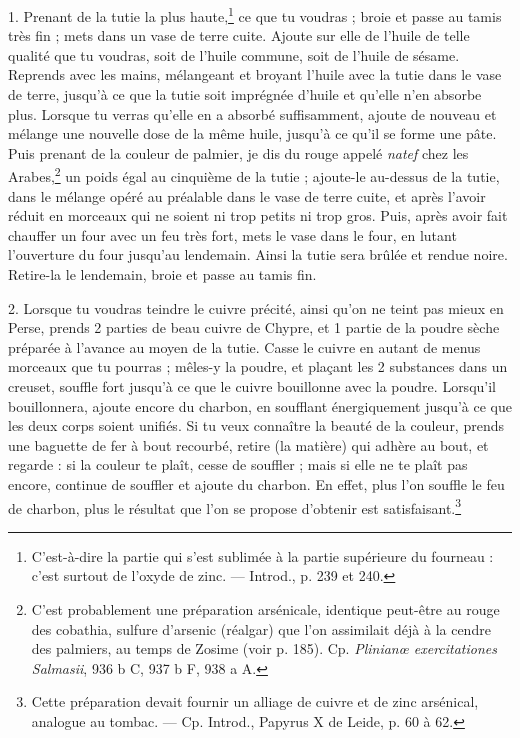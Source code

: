 \documentclass[a4paper, 11pt, oneside, polutonikogreek, french]{article}
\begin{document}
1. Prenant de la tutie la plus haute,\footnote{C'est-à-dire la partie qui s'est sublimée à la partie supérieure du fourneau : c'est surtout de l'oxyde de zinc. --- Introd., p. 239 et 240.} ce que tu voudras ; broie et passe au tamis très fin ; mets dans un vase de terre cuite. Ajoute sur elle de l'huile de telle qualité que tu voudras, soit de l'huile commune, soit de l'huile de sésame. Reprends avec les mains, mélangeant et broyant l'huile avec la tutie dans le vase de terre, jusqu'à ce que la tutie soit imprégnée d'huile et qu'elle n'en absorbe plus. Lorsque tu verras qu'elle en a absorbé suffisamment, ajoute de nouveau et mélange une nouvelle dose de la même huile, jusqu'à ce qu'il se forme une pâte. Puis prenant de la couleur de palmier, je dis du rouge appelé \emph{natef} chez les Arabes,\footnote{C'est probablement une préparation arsénicale, identique peut-être au rouge des cobathia, sulfure d'arsenic (réalgar) que l'on assimilait déjà à la cendre des palmiers, au temps de Zosime (voir p. 185). Cp. \emph{Plinianœ exercitationes Salmasii}, 936 b C, 937 b F, 938 a A.} un poids égal au cinquième de la tutie ; ajoute-le au-dessus de la tutie, dans le mélange opéré au préalable dans le vase de terre cuite, et après l'avoir réduit en morceaux qui ne soient ni trop petits ni trop gros. Puis, après avoir fait chauffer un four avec un feu très fort, mets le vase dans le four, en lutant l'ouverture du four jusqu'au lendemain. Ainsi la tutie sera brûlée et rendue noire. Retire-la le lendemain, broie et passe au tamis fin.

2. Lorsque tu voudras teindre le cuivre précité, ainsi qu'on ne teint pas mieux en Perse, prends 2 parties de beau cuivre de Chypre, et 1 partie de la poudre sèche préparée à l'avance au moyen de la tutie. Casse le cuivre en autant de menus morceaux que tu pourras ; mêles-y la poudre, et plaçant les 2 substances dans un creuset, souffle fort jusqu'à ce que le cuivre bouillonne avec la poudre. Lorsqu'il bouillonnera, ajoute encore du charbon, en soufflant énergiquement jusqu'à ce que les deux corps soient unifiés. Si tu veux connaître la beauté de la couleur, prends une baguette de fer à bout recourbé, retire (la matière) qui adhère au bout, et regarde : si la couleur te plaît, cesse de souffler ; mais si elle ne te plaît pas encore, continue de souffler et ajoute du charbon. En effet, plus l'on souffle le feu de charbon, plus le résultat que l'on se propose d'obtenir est satisfaisant.\footnote{Cette préparation devait fournir un alliage de cuivre et de zinc arsénical, analogue au tombac. --- Cp. Introd., Papyrus X de Leide, p. 60 à 62.}
\end{document}

